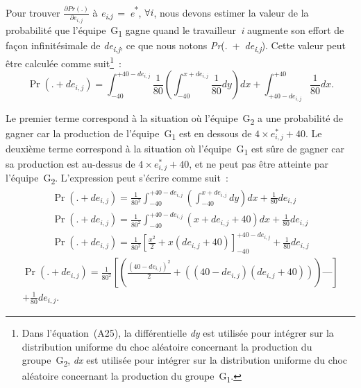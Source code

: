 \begin{Article}
\begin{refsection}[Lebourges]
\begin{appendices}
Pour trouver \(\frac{\partial Pr(.)}{\partial e_{i,j}}\) à
\emph{e\textsubscript{i}}\textsubscript{,\emph{j}}~=~\emph{e}\textsuperscript{*},
$\forall\emph{i}$, nous devons estimer la valeur de la probabilité que
l'équipe~G\textsubscript{1} gagne quand le travailleur~\emph{i} augmente
son effort de façon infinitésimale de
\emph{de\textsubscript{i}}\textsubscript{,\emph{j}}, ce que nous notons
\emph{Pr}(.~+~\emph{de\textsubscript{i}}\textsubscript{,\emph{j}}).
Cette valeur peut être calculée comme suit\footnote{Dans
  l'équation~(A25), la différentielle \emph{dy} est utilisée pour
  intégrer sur la distribution uniforme du choc aléatoire concernant la
  production du groupe~G\textsubscript{2}, \emph{dx} est utilisée pour
  intégrer sur la distribution uniforme du choc aléatoire concernant la
  production du groupe~G\textsubscript{1}.}~:
\begin{equation}
    \Pr\left( . + de_{i,j} \right) = \int_{- 40}^{+ 40 - de_{i,j}}{\frac{1}{80}\left( \int_{- 40}^{x + de_{i,j}}\frac{1}{80}dy \right)}dx + \int_{+ 40 - de_{i,j}}^{+ 40}{\frac{1}{80}dx}.
\end{equation}

Le premier terme correspond à la situation où
l'équipe~G\textsubscript{2} a une probabilité de gagner car la
production de l'équipe~G\textsubscript{1} est en dessous de
\(4 \times e_{i,j}^{*} + 40\). Le deuxième terme correspond à la
situation où l'équipe~G\textsubscript{1} est sûre de gagner car sa
production est au-dessus de \(4 \times e_{i,j}^{*} + 40\), et ne peut
pas être atteinte par l'équipe~G\textsubscript{2}. L'expression peut
s'écrire comme suit~:
\begin{gather*}
\Pr\left( . + de_{i,j} \right) = \frac{1}{80^{2}}\int_{- 40}^{+ 40 - de_{i,j}}\left( \int_{- 40}^{x + de_{i,j}}{dy} \right)dx + \frac{1}{80}de_{i,j} \\
\Pr\left( . + de_{i,j} \right) = \frac{1}{80^{2}}\int_{- 40}^{+ 40 - de_{i,j}}\left( x + de_{i,j} + 40 \right)dx + \frac{1}{80}de_{i,j} \\
\Pr\left( . + de_{i,j} \right) = \frac{1}{80^{2}}\left\lbrack \frac{x^{2}}{2} + x\left( de_{i,j} + 40 \right)\right\rbrack_{- 40}^{+ 40 - de_{i,j}} + \frac{1}{80}de_{i,j}
\end{gather*}
\begin{multline}
\Pr\left( . + de_{i,j} \right) = \frac{1}{80^{2}}\left\lbrack \left( \frac{\left( 40 - de_{i,j} \right)^{2}}{2} + \left( \left( 40 - de_{i,j} \right)\left( de_{i,j} + 40 \right) \right) \right)— \right\rbrack \\
+ \frac{1}{80}de_{i,j}.  
\end{multline}


\end{appendices}
\end{refsection}
\end{Article}
